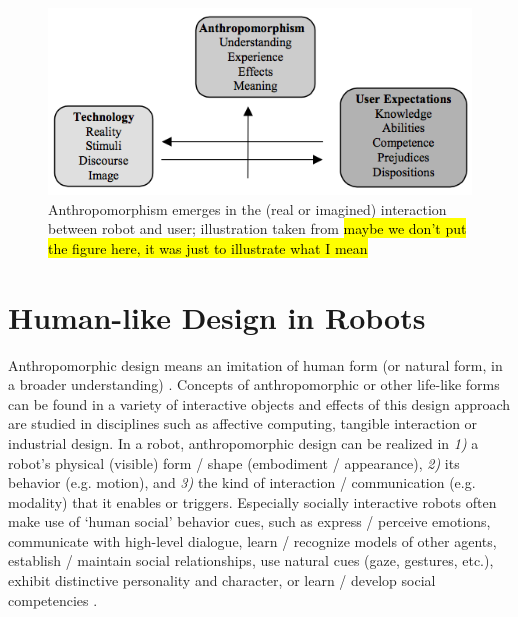 \documentclass[lettersize, apacite, twoside, HRI]{apa_HRI}
\begin{document}
\begin{figure}\centering
  \includegraphics[scale=0.42]{persson_anthropomorphism.png}
 \caption{Anthropomorphism emerges in the (real or imagined) interaction between robot and user; illustration taken from \cite{persson_anthropomorphism_2000} \hl{maybe we don't put the figure here, it was just to illustrate what I mean}}
 \label{fig:anthropomorphism_and_interaction}       %
 \end{figure}
	


%
%
%
%
%
%


\section{Human-like Design in Robots}
\label{sec:4}

	Anthropomorphic design means an imitation of human form (or natural form, in a broader understanding) \cite{disalvo_seduction_2003}. Concepts of anthropomorphic or other life-like forms can be found in a variety of interactive objects and effects of this design approach are studied in disciplines such as affective computing, tangible interaction or industrial design. In a robot, anthropomorphic design can be realized in \textit{1)} a robot's physical (visible) form / shape (embodiment / appearance), \textit{2)} its behavior (e.g. motion), and \textit{3)} the kind of interaction / communication (e.g. modality) that it enables or triggers. Especially socially interactive robots often make use of `human social' behavior cues, such as express / perceive emotions, communicate with high-level dialogue, learn / recognize models of other agents, establish / maintain social relationships, use natural cues (gaze, gestures, etc.), exhibit distinctive personality and character, or learn / develop social competencies \cite{fong_survey_2003}.
 
\end{document}
